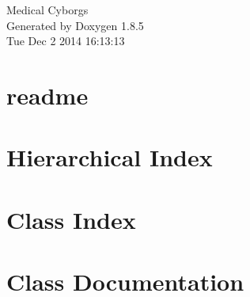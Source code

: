 \documentclass[twoside]{book}
\newcommand{\clearemptydoublepage}{%
  \newpage{\pagestyle{empty}\cleardoublepage}%
}
\begin{document}
\hypersetup{pageanchor=false}
\begin{titlepage}
\vspace*{7cm}
\begin{center}%
{\Large Medical Cyborgs }\\
\vspace*{1cm}
{\large Generated by Doxygen 1.8.5}\\
\vspace*{0.5cm}
{\small Tue Dec 2 2014 16:13:13}\\
\end{center}
\end{titlepage}
\clearemptydoublepage
\tableofcontents
\clearemptydoublepage
{}
\hypersetup{pageanchor=true}

\chapter{readme}
\label{md___users_douglas__documents_software__senior__project_ios__medical__cyborgs__medical__cyborgs_readme}
\hypertarget{md___users_douglas__documents_software__senior__project_ios__medical__cyborgs__medical__cyborgs_readme}{}

\chapter{Hierarchical Index}

\chapter{Class Index}

\chapter{Class Documentation}

































\newpage
{}
{}
\printindex
\end{document}
